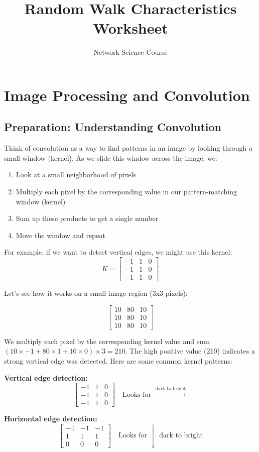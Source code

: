\documentclass[a4paper, 12pt]{extarticle}
\title{Random Walk Characteristics Worksheet}
\author{Network Science Course}
\date{}
\begin{document}
\section{Image Processing and Convolution}

\subsection{Preparation: Understanding Convolution}
Think of convolution as a way to find patterns in an image by looking through a small window (kernel). As we slide this window across the image, we:
\begin{enumerate}
    \item Look at a small neighborhood of pixels
    \item Multiply each pixel by the corresponding value in our pattern-matching window (kernel)
    \item Sum up these products to get a single number
    \item Move the window and repeat
\end{enumerate}

For example, if we want to detect vertical edges, we might use this kernel:
\[
K = \begin{bmatrix}
-1 & 1 & 0 \\
-1 & 1 & 0 \\
-1 & 1 & 0
\end{bmatrix}
\]

Let's see how it works on a small image region (3x3 pixels):

\[
\begin{bmatrix}
10 & 80 & 10 \\
10 & 80 & 10 \\
10 & 80 & 10
\end{bmatrix}
\]

We multiply each pixel by the corresponding kernel value and sum: $(10 \times -1 + 80 \times 1 + 10 \times 0) \times 3 = 210$. The high positive value (210) indicates a strong vertical edge was detected.
Here are some common kernel patterns:

\textbf{Vertical edge detection:}
\[
\begin{bmatrix}
-1 & 1 & 0 \\
-1 & 1 & 0 \\
-1 & 1 & 0
\end{bmatrix}
\quad
\text{Looks for } \xrightarrow{\text{dark to bright}}
\]

\textbf{Horizontal edge detection:}
\[
\begin{bmatrix}
-1 & -1 & -1 \\
1 & 1 & 1 \\
0 & 0 & 0
\end{bmatrix}
\quad
\text{Looks for } \downarrow \text{ dark to bright}
\]
\end{document}
